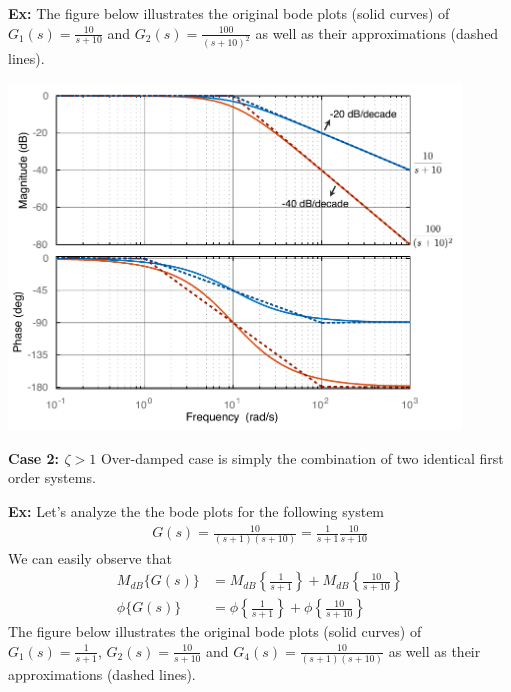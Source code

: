 \documentclass[twoside]{article}
\begin{document}
\textbf{Ex:} The figure below
illustrates the original bode plots (solid curves) of $G_1(s) = \frac{10}{s+10}$ and $G_2(s) = \frac{100}{(s+10)^2}$ as well as
their approximations (dashed lines). 

\vspace{6 pt}

  \begin{minipage}[h]{1\linewidth}
    \begin{center}
      \includegraphics[width=0.9\textwidth]{second}
    \end{center}
  \end{minipage}

\vspace{6 pt}

\textbf{Case 2: $\zeta > 1$} Over-damped case is simply the combination of two identical first order
systems. 

\textbf{Ex:}  Let's analyze the the bode plots for the following system
%
\begin{align*}
	G(s) =  \frac{10}{(s+1)(s+10)}
		= \frac{1}{ s + 1 } \frac{10}{ s + 10 }
\end{align*}
%
We can easily observe that 
\begin{align*}
  M_{dB} \lbrace G(s) \rbrace &= M_{dB} \left\lbrace \frac{1}{s+1}  \right\rbrace +
   M_{dB} \left\lbrace \frac{10}{s+10}  \right\rbrace
	\\  
  \phi \lbrace G(s) \rbrace &= \phi \left\lbrace \frac{1}{s + 1}  \right\rbrace + 
   \phi \left\lbrace \frac{10}{s + 10}  \right\rbrace 
\end{align*}
%
The figure below
illustrates the original bode plots (solid curves) of $G_1(s) = \frac{1}{s+1}$, $G_2(s) = \frac{10}{s+10}$ and $G_4(s) = \frac{10}{(s+1) (s+10)}$ as well as their approximations (dashed lines). 
\end{document}
